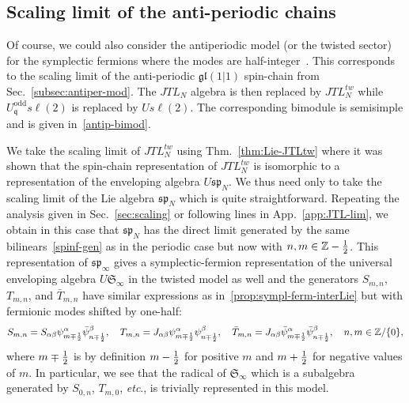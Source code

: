 \documentclass[11pt]{article}
\newcommand{\strt}{T}
\newcommand{\bstrt}{\bar{\strt}}
\newcommand{\q}{\mathfrak{q}}
\newcommand{\ffrac}[2]{\mbox{\footnotesize$\displaystyle\frac{#1}{#2}$}}
\newcommand{\JTL}[1]{JTL_{#1}}
\newcommand{\LQGodd}{U^{\text{odd}}_{\q} s\ell(2)}
\newcommand{\half}{%
  \mathchoice{\ffrac{1}{2}}{\frac{1}{2}}{\frac{1}{2}}{\frac{1}{2}}}
\newcommand{\sferm}{\psi}
\newcommand{\bsferm}{\bar{\psi}}
\newcommand{\oZ}{\mathbb{Z}}
\newcommand{\interLie}{\mathfrak{S}}
\newcommand{\spinf}{\ssp_{\infty}}
\newcommand{\interinfin}{\interLie_{\infty}}
\newcommand{\gl}{\mathfrak{gl}}
\newcommand{\ssp}{\mathfrak{sp}}
\newcommand{\bimnch}{\boldsymbol{\mathcal{H}}}
\newcommand{\enrg}{S}
\theoremstyle{definition}
\begin{document}
 \subsection{Scaling limit of the anti-periodic chains}\label{sec:scal-lim-tw}
Of course, we could also consider the antiperiodic model (or the twisted sector) for the
symplectic fermions  where the   modes are half-integer~\cite{Kausch}. This corresponds to  the scaling limit of
the anti-periodic $\gl(1|1)$ spin-chain from
Sec.~\ref{subsec:antiper-mod}.  The
$\JTL{N}$ algebra is  then replaced by $\JTL{N}^{tw}$ while $\LQGodd$ is replaced by $U
s\ell(2)$. The corresponding bimodule is semisimple and is given
in~\eqref{antip-bimod}.

We take the scaling limit of $\JTL{N}^{tw}$ using Thm.~\ref{thm:Lie-JTLtw} where it was shown  that the spin-chain representation  of $\JTL{N}^{tw}$ is isomorphic to a representation of the enveloping algebra $U \ssp_{N}$.  We thus need only to take the scaling limit of the Lie algebra $\ssp_{N}$ which is quite straightforward. Repeating the analysis given in Sec.~\ref{sec:scaling} or following lines in App.~\ref{app:JTL-lim},
we obtain in this case that  $\ssp_{N}$ has the
 direct limit generated by the same  bilinears~\eqref{spinf-gen} as in the periodic case but now with $n,m\in\oZ-\half$. This representation of $\spinf$ gives a symplectic-fermion representation
of the universal enveloping algebra $U\interinfin$
in  the twisted model as well and the generators $\enrg_{m,n}$, $\strt_{m,n}$, and $\bstrt_{m,n}$  have  similar expressions as in~\eqref{prop:sympl-ferm-interLie} but with fermionic modes shifted by one-half:
 \begin{equation}\label{eq:sympl-ferm-tw-interLie}
\enrg_{m,n} =S_{\alpha\beta} \psi^{\alpha}_{m\mp\half} \bar{\psi}^{\beta}_{n\mp\half},\quad
\strt_{m,n}=J_{\alpha\beta}{\sferm^{\alpha}_{m\mp\half}\sferm^{\beta}_{n\mp\half}},\quad \bstrt_{m,n}=J_{\alpha\beta}{\bsferm^{\alpha}_{m\mp\half}\bsferm^{\beta}_{n\mp\half}}, \quad n,m\in\oZ/\{0\},
\end{equation}
where $m\mp\half$ is by definition $m-\half$ for positive $m$ and $m+\half$ for negative values of $m$.
In particular, we see that the radical of $\interinfin$ which is a subalgebra generated by $\enrg_{0,n}$, $\strt_{m,0}$, {\it etc}.,  is trivially represented in this model.
\end{document}
